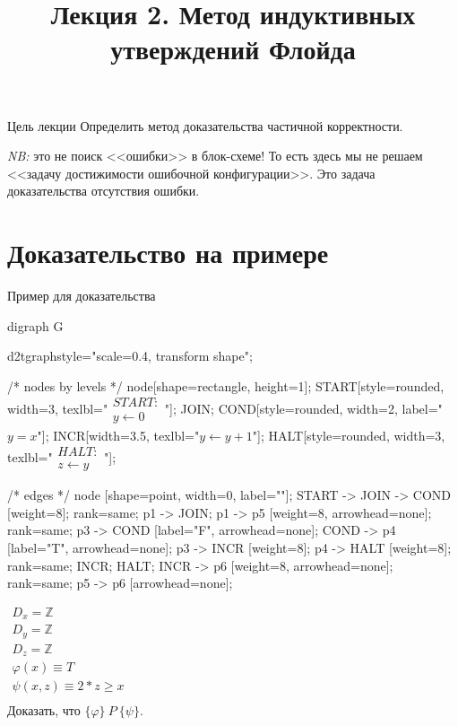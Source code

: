 \documentclass[hyperref={unicode=true}]{beamer}
\title{Лекция 2. Метод индуктивных утверждений Флойда}
\author{}
\date{}
\begin{document}
	\begin{frame}{}
		\titlepage
	\end{frame}

    \begin{frame}{Цель лекции}
    Определить метод доказательства частичной корректности.

    \textit{NB:} это не поиск <<ошибки>> в блок-схеме! То есть здесь мы не решаем <<задачу достижимости ошибочной конфигурации>>. Это задача доказательства отсутствия ошибки.
    \end{frame}

    \section{Доказательство на примере}

	\begin{frame}[fragile]{Пример для доказательства}
	\setlength{\columnsep}{4cm}

	\begin{multicols}{2}

	\huge
	\begin{dot2tex}[options=-traw]
	digraph G{
		d2tgraphstyle="scale=0.4, transform shape";

		/* nodes by levels */
		node[shape=rectangle, height=1];
		START[style=rounded, width=3, texlbl="$\begin{matrix}START:\\ y \leftarrow 0\end{matrix}$"];
		JOIN;
        COND[style=rounded, width=2, label="$y = x$"];
		INCR[width=3.5, texlbl="$y \leftarrow y + 1$"];
        HALT[style=rounded, width=3, texlbl="$\begin{matrix}HALT:\\  z \leftarrow y\end{matrix}$"];

		/* edges */
		node [shape=point, width=0, label=""];
		START -> JOIN -> COND [weight=8];
		{ rank=same; p1 -> JOIN; }
		p1 -> p5 [weight=8, arrowhead=none];
		{ rank=same; p3 -> COND [label="F", arrowhead=none]; COND -> p4 [label="T", arrowhead=none]; }
		p3 -> INCR [weight=8];
		p4 -> HALT [weight=8];
		{ rank=same; INCR; HALT; }
		INCR -> p6 [weight=8, arrowhead=none];
		{ rank=same; p5 -> p6 [arrowhead=none]; }
	}
	\end{dot2tex}

	\large

    $\begin{matrix}
    D_x = \mathbb{Z}\\
    D_y = \mathbb{Z}\\
    D_z = \mathbb{Z}\\
    \varphi(x) \equiv T\\
    \psi(x, z) \equiv 2 * z \geq x\\
    \end{matrix}$\\

    Доказать, что $\{\varphi\}~P~\{\psi\}$.
	\end{multicols}

	\end{frame}
\end{document}
